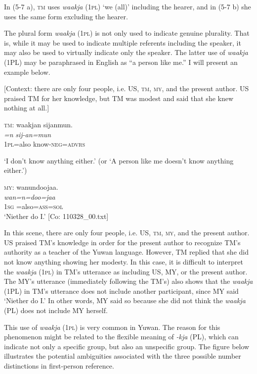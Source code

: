 In (5-7 a), \textsc{tm} uses \textit{waakja} (1\textsc{pl}) ‘we (all)’ including the hearer, and in (5-7 b) she uses the same form excluding the hearer.

  The plural form \textit{waakja} (1\textsc{pl}) is not only used to indicate genuine plurality. That is, while it may be used to indicate multiple referents including the speaker, it may also be used to virtually indicate only the speaker. The latter use of \textit{waakja} (1PL) may be paraphrased in English as “a person like me.” I will present an example below.

\ea \label{ex:5:8}   [Context: there are only four people, i.e. US, \textsc{tm}, \textsc{my}, and the present author. US praised TM for her knowledge, but TM was modest and said that she knew nothing at all.]

  \textsc{tm}: \glll  waakjan  sijanmun.\\
    \textit{=n}  \textit{sij-an=mun}\\
    1\textsc{pl}=also  know-\textsc{neg}=\textsc{advrs}\\
    \glt {} \parbox{\linewidth-\widthof{TM:}}{‘I don’t know anything either.’ (or ‘A person like me doesn’t know anything either.’)}

\textsc{my}: \glll  wanundoojaa.\\
\textit{wan=n=doo=jaa}\\
1\textsc{sg} =also=\textsc{ass}=\textsc{sol}\\
\glt {} ‘Niether do I.’ [Co: 110328\_00.txt]
\z

In this scene, there are only four people, i.e. US, \textsc{tm}, \textsc{my}, and the present author. US praised TM’s knowledge in order for the present author to recognize TM’s authority as a teacher of the Yuwan language. However, TM replied that she did not know anything showing her modesty. In this case, it is difficult to interpret the \textit{waakja} (1\textsc{pl}) in TM’s utterance as including US, MY, or the present author. The MY’s utterance (immediately following the TM’s) also shows that the \textit{waakja} (1PL) in TM’s utterance does not include another participant, since MY said ‘Niether do I.’ In other words, MY said so because she did not think the \textit{waakja} (PL) does not include MY herself.

This use of \textit{waakja} (1\textsc{pl}) is very common in Yuwan. The reason for this phenomenon might be related to the flexible meaning of \textit{{}-kja} (PL), which can indicate not only a specific group, but also an unspecific group. The figure below illustrates the potential ambiguities associated with the three possible number distinctions in first-person reference.



